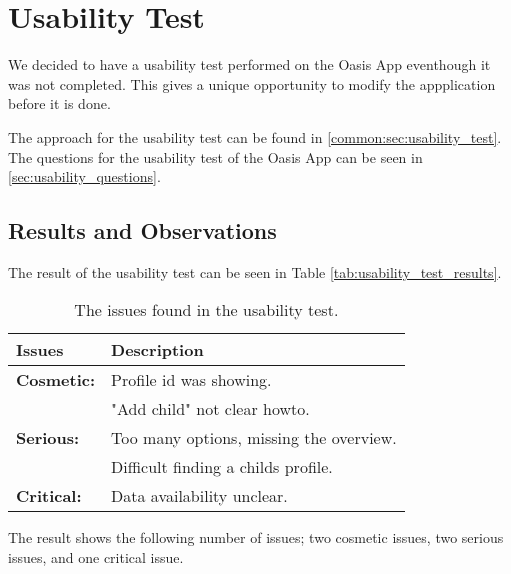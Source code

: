 \section{Usability Test}
We decided to have a usability test performed on the Oasis App eventhough it was not completed.
This gives a unique opportunity to modify the appplication before it is done.

The approach for the usability test can be found in \vref{common:sec:usability_test}.
The questions for the usability test of the Oasis App can be seen in \vref{sec:usability_questions}.

\subsection{Results and Observations}
\label{sec:usability_results}
The result of the usability test can be seen in Table \vref{tab:usability_test_results}.

\begin{table}[htbp]
	\centering
		\begin{tabular}{| p{4.5cm} | m{9cm} |}
			\hline
			\textbf{Issues} 	& \textbf{Description} \\ \hline
			
			\textbf{Cosmetic:}	& Profile id was showing. \\ 
								& "Add child" not clear howto. \\ \hline
							
			\textbf{Serious:}	& Too many options, missing the overview. \\
								& Difficult finding a childs profile. \\ \hline
						
			\textbf{Critical:} 	& Data availability unclear. \\ \hline
		\end{tabular}
	\caption{The issues found in the usability test.}
	\label{tab:usability_test_results}
\end{table}

The result shows the following number of issues; two cosmetic issues, two serious issues, and one critical issue.